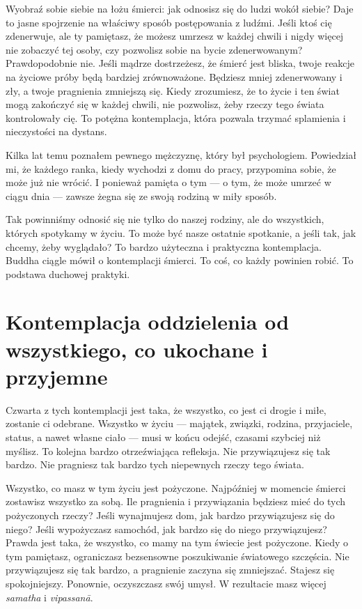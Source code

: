 \documentclass[12pt,openany]{book}
\begin{document}
Wyobraź sobie siebie na łożu śmierci: jak odnosisz się do ludzi wokół siebie? Daje to jasne spojrzenie na właściwy sposób postępowania z ludźmi. Jeśli ktoś cię zdenerwuje, ale ty pamiętasz, że możesz umrzesz w każdej chwili i nigdy więcej nie zobaczyć tej osoby, czy pozwolisz sobie na bycie zdenerwowanym? Prawdopodobnie nie. Jeśli mądrze dostrzeżesz, że śmierć jest bliska, twoje reakcje na życiowe próby będą bardziej zrównoważone. Będziesz mniej zdenerwowany i zły, a twoje pragnienia zmniejszą się. Kiedy zrozumiesz, że to życie i ten świat mogą zakończyć się w każdej chwili, nie pozwolisz, żeby rzeczy tego świata kontrolowały cię. To potężna kontemplacja, która pozwala trzymać splamienia i nieczystości na dystans.

Kilka lat temu poznałem pewnego mężczyznę, który był psychologiem. Powiedział mi, że każdego ranka, kiedy wychodzi z domu do pracy, przypomina sobie, że może już nie wrócić. I ponieważ pamięta o tym --- o tym, że może umrzeć w ciągu dnia --- zawsze żegna się ze swoją rodziną w miły sposób.

Tak powinniśmy odnosić się nie tylko do naszej rodziny, ale do wszystkich, których spotykamy w życiu. To może być nasze ostatnie spotkanie, a jeśli tak, jak chcemy, żeby wyglądało? To bardzo użyteczna i praktyczna kontemplacja. Buddha ciągle mówił o kontemplacji śmierci. To coś, co każdy powinien robić. To podstawa duchowej praktyki.

\section*{Kontemplacja oddzielenia od wszystkiego, co ukochane i przyjemne}

Czwarta z tych kontemplacji jest taka, że wszystko, co jest ci drogie i miłe, zostanie ci odebrane. Wszystko w życiu --- majątek, związki, rodzina, przyjaciele, status, a nawet własne ciało --- musi w końcu odejść, czasami szybciej niż myślisz. To kolejna bardzo otrzeźwiająca refleksja. Nie przywiązujesz się tak bardzo. Nie \linebreak pragniesz tak bardzo tych niepewnych rzeczy tego świata.

Wszystko, co masz w tym życiu jest pożyczone. Najpóźniej w momencie śmierci zostawisz wszystko za sobą. Ile pragnienia i przywiązania będziesz mieć do tych pożyczonych rzeczy? Jeśli wynajmujesz dom, jak bardzo przywiązujesz się do niego? Jeśli wypożyczasz samochód, jak bardzo się do niego przywiązujesz? Prawda jest taka, że wszystko, co mamy na tym świecie jest pożyczone. Kiedy o tym pamiętasz, ograniczasz bezsensowne poszukiwanie światowego szczęścia. Nie przywiązujesz się tak bardzo, a pragnienie zaczyna się zmniejszać. Stajesz się spokojniejszy. Ponownie, oczyszczasz swój umysł. W rezultacie masz więcej \textit{samatha} i \textit{vipassanā}.
\end{document}
